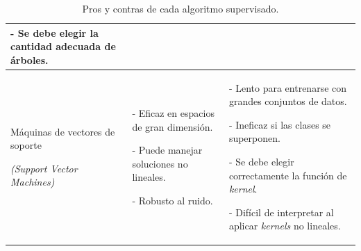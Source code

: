 \documentclass[a4paper,12pt]{article}
\begin{document}
\begin{landscape}
\begin{table}[]
\begin{tabularx}{\hsize}{|X|X|X|}
			- Se debe elegir la cantidad adecuada de árboles.
			\\ \hline
			Máquinas de vectores de soporte 
						
			\textit{(Support Vector Machines)}  & 
			- Eficaz en espacios de gran dimensión.
						
			- Puede manejar soluciones no lineales.
						
			- Robusto al ruido.
			& 
			- Lento para entrenarse con grandes conjuntos de datos. 
						
			- Ineficaz si las clases se superponen.
						
			- Se debe elegir correctamente la función de \textit{kernel}.
						
			- Difícil de interpretar al aplicar \textit{kernels} no lineales.
			\\ \hline
		\end{tabularx}
		\caption{Pros y contras de cada algoritmo supervisado.}
		\label{tab:pro-cons-supervised}
	\end{table}
		
\end{landscape}
\end{document}
